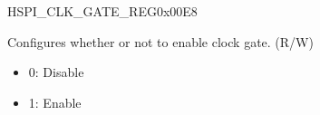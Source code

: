 \begin{register}{H}{SPI\_CLK\_GATE\_REG}{0x00E8}\label{regdesc:SPICLKGATEREG}
%
%
%
%
\regnewline%
\begin{regdesc}\begin{reglist}
\label{fielddesc:SPICLKEN}\item [SPI\_CLK\_EN] Configures whether or not to enable clock gate. (R/W)\\
\begin{itemize}
    \item 0: Disable
    \item 1: Enable
\end{itemize}
\end{reglist}\end{regdesc}
\end{register}

